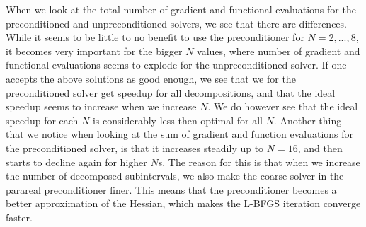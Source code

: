 When we look at the total number of gradient and functional evaluations for the preconditioned and unpreconditioned solvers, we see that there are differences. While it seems to be little to no benefit to use the preconditioner for $N=2,...,8$, it becomes very important for the bigger $N$ values, where number of gradient and functional evaluations seems to explode for the unpreconditioned solver. If one accepts the above solutions as good enough, we see that we for the preconditioned solver get speedup for all decompositions, and that the ideal speedup seems to increase when we increase $N$. We do however see that the ideal speedup for each $N$ is considerably less then optimal for all $N$. Another thing that we notice when looking at the sum of gradient and function evaluations for the preconditioned solver, is that it increases steadily up to $N=16$, and then starts to decline again for higher $N$s. The reason for this is that when we increase the number of decomposed subintervals, we also make the coarse solver in the parareal preconditioner finer. This means that the preconditioner becomes a better approximation of the Hessian, which makes the L-BFGS iteration converge faster.
